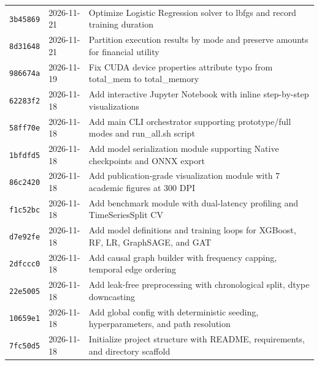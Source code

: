 \documentclass[11pt,a4paper]{report}
\begin{document}
\begin{table}[H]
\begin{tabular}{lll}
\texttt{3b45869} & 2026-11-21 & Optimize Logistic Regression solver to lbfgs and record training duration \\
\texttt{8d31648} & 2026-11-21 & Partition execution results by mode and preserve amounts for financial utility \\
\texttt{986674a} & 2026-11-19 & Fix CUDA device properties attribute typo from total\_mem to total\_memory \\
\texttt{62283f2} & 2026-11-18 & Add interactive Jupyter Notebook with inline step-by-step visualizations \\
\texttt{58ff70e} & 2026-11-18 & Add main CLI orchestrator supporting prototype/full modes and run\_all.sh script \\
\texttt{1bfdfd5} & 2026-11-18 & Add model serialization module supporting Native checkpoints and ONNX export \\
\texttt{86c2420} & 2026-11-18 & Add publication-grade visualization module with 7 academic figures at 300 DPI \\
\texttt{f1c52bc} & 2026-11-18 & Add benchmark module with dual-latency profiling and TimeSeriesSplit CV \\
\texttt{d7e92fe} & 2026-11-18 & Add model definitions and training loops for XGBoost, RF, LR, GraphSAGE, and GAT \\
\texttt{2dfccc0} & 2026-11-18 & Add causal graph builder with frequency capping, temporal edge ordering \\
\texttt{22e5005} & 2026-11-18 & Add leak-free preprocessing with chronological split, dtype downcasting \\
\texttt{10659e1} & 2026-11-18 & Add global config with deterministic seeding, hyperparameters, and path resolution \\
\texttt{7fc50d5} & 2026-11-18 & Initialize project structure with README, requirements, and directory scaffold \\
\bottomrule
\end{tabular}
\end{table}

\newpage
\end{document}
